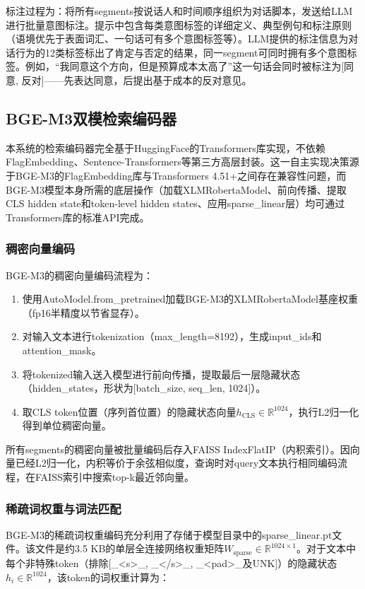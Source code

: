 \documentclass[12pt, a4paper]{article}
\begin{document}
标注过程为：将所有segments按说话人和时间顺序组织为对话脚本，发送给LLM进行批量意图标注。提示中包含每类意图标签的详细定义、典型例句和标注原则（语境优先于表面词汇、一句话可有多个意图标签等）。LLM提供的标注信息为对话行为的12类标签标出了肯定与否定的结果，同一segment可同时拥有多个意图标签。例如，``我同意这个方向，但是预算成本太高了''这一句话会同时被标注为[同意, 反对]——先表达同意，后提出基于成本的反对意见。

\subsection{BGE-M3双模检索编码器}

本系统的检索编码器完全基于HuggingFace的Transformers库实现，不依赖FlagEmbedding、Sentence-Transformers等第三方高层封装。这一自主实现决策源于BGE-M3的FlagEmbedding库与Trans\-formers 4.51+之间存在兼容性问题，而BGE-M3模型本身所需的底层操作（加载XLMRobertaModel、前向传播、提取CLS hidden state和token-level hidden states、应用sparse\_linear层）均可通过Transformers库的标准API完成。

\subsubsection{稠密向量编码}

BGE-M3的稠密向量编码流程为：
\begin{enumerate}[label=(\arabic*)]
    \item 使用AutoModel.from\_pretrained加载BGE-M3的XLMRobertaModel基座权重（fp16半精度以节省显存）。
    \item 对输入文本进行tokenization（max\_length=8192），生成input\_ids和attention\_mask。
    \item 将tokenized输入送入模型进行前向传播，提取最后一层隐藏状态（hidden\_states，形状为[batch\_size, seq\_len, 1024]）。
    \item 取CLS token位置（序列首位置）的隐藏状态向量$h_{\text{CLS}} \in \mathbb{R}^{1024}$，执行L2归一化得到单位稠密向量。
\end{enumerate}

所有segments的稠密向量被批量编码后存入FAISS IndexFlatIP（内积索引）。因向量已经L2归一化，内积等价于余弦相似度，查询时对query文本执行相同编码流程，在FAISS索引中搜索top-k最近邻向量。

\subsubsection{稀疏词权重与词法匹配}

BGE-M3的稀疏词权重编码充分利用了存储于模型目录中的sparse\_linear.pt文件。该文件是约3.5 KB的单层全连接网络权重矩阵$W_{\text{sparse}} \in \mathbb{R}^{1024 \times 1}$。对于文本中每个非特殊token（排除[\_<s>\_, \_</s>\_, \_<pad>\_及UNK]）的隐藏状态$h_i \in \mathbb{R}^{1024}$，该token的词权重计算为：
\end{document}
